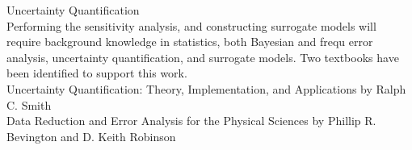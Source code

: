 \documentclass{article}
\begin{document}
Uncertainty Quantification\\
Performing the sensitivity analysis, and constructing surrogate models will require background knowledge in statistics, both Bayesian and frequ error analysis, uncertainty quantification, and surrogate models. Two textbooks have been identified to support this work.\\
Uncertainty Quantification: Theory, Implementation, and Applications by Ralph C. Smith\\
Data Reduction and Error Analysis for the Physical Sciences by Phillip R. Bevington and D. Keith Robinson\\

\newpage


\end{document}
